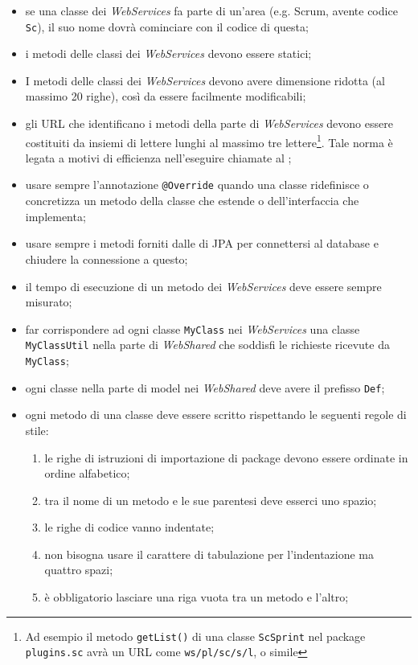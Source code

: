 \begin{itemize}
	\item se una classe dei \emph{WebServices} fa parte di un'area (e.g.
	Scrum, avente codice \texttt{Sc}), il suo nome dovrà cominciare con il
	codice di questa;
	\item i metodi delle classi dei \emph{WebServices} devono essere statici;
	\item I metodi delle classi dei \emph{WebServices} devono avere dimensione
	ridotta (al massimo 20 righe), così da essere facilmente modificabili;
	\item gli URL che identificano i metodi della parte di \emph{WebServices}
	devono essere costituiti da insiemi di lettere lunghi al massimo tre
	lettere\footnote{Ad esempio il metodo \texttt{getList()} di una classe
	\texttt{ScSprint} nel package \texttt{plugins.sc} avrà un URL come
	\texttt{ws/pl/sc/s/l}, o simile}. Tale norma è legata a motivi di efficienza
	nell'eseguire chiamate  al \BKEND{};
	\item usare sempre l'annotazione \texttt{@Override} quando una classe
	ridefinisce o concretizza un metodo della classe che estende o
	dell'interfaccia che implementa;
	\item usare sempre i metodi forniti dalle  di JPA per connettersi al
	database e chiudere la connessione a questo;
	\item il tempo di esecuzione di un metodo dei \emph{WebServices} deve essere
	sempre misurato;
	\item far corrispondere ad ogni classe \texttt{MyClass} nei
	\emph{WebServices} una classe \texttt{MyClassUtil} nella parte di
	\emph{WebShared} che soddisfi le richieste  ricevute da
	\texttt{MyClass};
	\item ogni classe nella parte di model nei \emph{WebShared} deve avere il
	prefisso \texttt{Def};
	\item ogni metodo di una classe deve essere scritto rispettando le seguenti
	regole di stile:
	\begin{enumerate}
		\item le righe di istruzioni di importazione di package devono essere
		ordinate in ordine alfabetico;
		\item tra il nome di un metodo e le sue parentesi deve esserci uno spazio;
		\item le righe di codice vanno indentate;
		\item non bisogna usare il carattere di tabulazione per l'indentazione ma
		quattro spazi;
		\item è obbligatorio lasciare una riga vuota tra un metodo e l'altro;

\end{enumerate}
\end{itemize}
